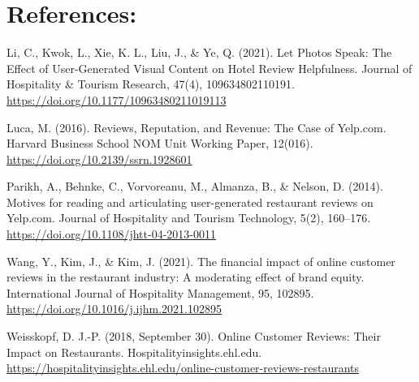 \documentclass[
]{article}
\begin{document}
\section{References:}\label{references}

Li, C., Kwok, L., Xie, K. L., Liu, J., \& Ye, Q. (2021). Let Photos
Speak: The Effect of User-Generated Visual Content on Hotel Review
Helpfulness. Journal of Hospitality \& Tourism Research, 47(4),
109634802110191. \url{https://doi.org/10.1177/10963480211019113}

Luca, M. (2016). Reviews, Reputation, and Revenue: The Case of Yelp.com.
Harvard Business School NOM Unit Working Paper, 12(016).
\url{https://doi.org/10.2139/ssrn.1928601}

Parikh, A., Behnke, C., Vorvoreanu, M., Almanza, B., \& Nelson, D.
(2014). Motives for reading and articulating user-generated restaurant
reviews on Yelp.com. Journal of Hospitality and Tourism Technology,
5(2), 160--176. \url{https://doi.org/10.1108/jhtt-04-2013-0011}

Wang, Y., Kim, J., \& Kim, J. (2021). The financial impact of online
customer reviews in the restaurant industry: A moderating effect of
brand equity. International Journal of Hospitality Management, 95,
102895. \url{https://doi.org/10.1016/j.ijhm.2021.102895}

Weisskopf, D. J.-P. (2018, September 30). Online Customer Reviews: Their
Impact on Restaurants. Hospitalityinsights.ehl.edu.
\url{https://hospitalityinsights.ehl.edu/online-customer-reviews-restaurants}
\end{document}
